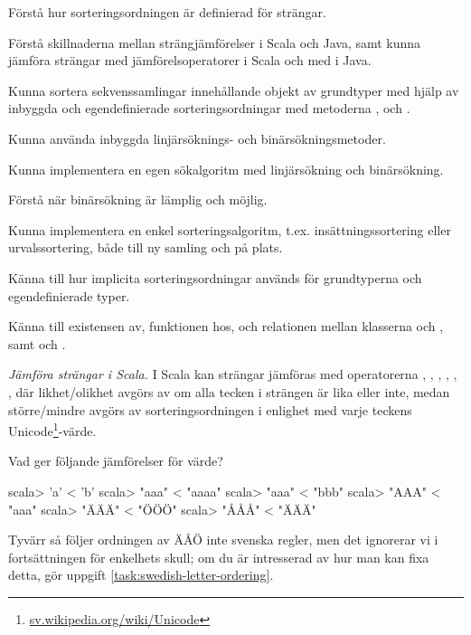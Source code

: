 

\Exercise{\ExeWeekELEVEN}\label{exe:W11}

\begin{Goals}
\item Förstå hur sorteringsordningen är definierad för strängar.
\item Förstå skillnaderna mellan strängjämförelser i Scala och Java, samt kunna jämföra strängar med jämförelsoperatorer i Scala och med  i Java.
\item Kunna sortera sekvenssamlingar innehållande objekt av grundtyper med hjälp av inbyggda och egendefinierade sorteringsordningar med metoderna ,  och .
\item Kunna använda inbyggda linjärsöknings- och binärsökningsmetoder. 
\item Kunna implementera en egen sökalgoritm med linjärsökning och binärsökning.
\item Förstå när binärsökning är lämplig och möjlig.
\item Kunna implementera en enkel sorteringsalgoritm, t.ex. insättningssortering eller urvalssortering, både till ny samling och på plats.   
\item Känna till hur implicita sorteringsordningar används för grundtyperna och egendefinierade typer.
\item Känna till existensen av, funktionen hos, och relationen mellan klasserna  och , samt   och .
\end{Goals}

\begin{Preparations}
\item {} 
\end{Preparations}

\BasicTasks %

\Task \label{task:string-order-operators}\emph{Jämföra strängar i Scala.} I Scala kan strängar jämföras med operatorerna \code{==}, \code{!=}, \code{<}, \code{<=}, \code{>}, \code{>=},  där likhet/olikhet avgörs av om alla tecken i strängen är lika eller inte, medan större/mindre avgörs av sorteringsordningen i enlighet med varje teckens Unicode\footnote{\href{https://sv.wikipedia.org/wiki/Unicode}{sv.wikipedia.org/wiki/Unicode}}-värde. 

\Subtask Vad ger följande jämförelser för värde?
\begin{REPL}
scala> 'a' < 'b'
scala> "aaa" < "aaaa"
scala> "aaa" < "bbb"
scala> "AAA" < "aaa"
scala> "ÄÄÄ" < "ÖÖÖ"
scala> "ÅÅÅ" < "ÄÄÄ"
\end{REPL}
Tyvärr så följer ordningen av ÄÅÖ inte svenska regler, men det ignorerar vi i fortsättningen för enkelhets skull; om du är intresserad av hur man kan fixa  detta, gör uppgift \ref{task:swedish-letter-ordering}. 

